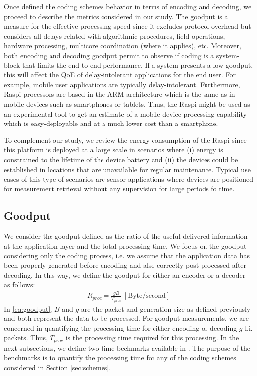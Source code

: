 \label{sec:metrics}

Once defined the coding schemes behavior in terms of encoding
and decoding, we proceed to describe the metrics considered in our study.
The goodput is a measure for the effective processing speed since it
excludes protocol overhead but considers all delays related with
algorithmic procedures, field operations, hardware processing, multicore
coordination (where it applies), etc. Moreover, both encoding and decoding
goodput permit to observe if coding is a system-block that limits the
end-to-end performance. If a system presents a low goodput, this will
affect the \ac{QoE} of delay-intolerant applications for the end user.
For example, mobile user applications are typically delay-intolerant.
Furthermore, \ac{Raspi} processors are based in the \ac{ARM} architecture
which is the same as in mobile devices such as smartphones or tablets.
Thus, the \ac{Raspi} might be used as an experimental tool to get an
estimate of a mobile device processing capability which is easy-deployable
and at a much lower cost than a smartphone.

To complement our study, we review the energy consumption of the \ac{Raspi}
since this platform is deployed at a large scale in scenarios where (i)
energy is constrained to the lifetime of the device battery and (ii) the
devices could be established in locations that are unavailable for
regular maintenance. Typical use cases of this type of scenarios are
sensor applications where devices are positioned for measurement retrieval
without any supervision for large periods fo time.

\subsection{Goodput}
We consider the goodput defined as the ratio of the useful delivered
information at the application layer and the total processing time. We focus
on the goodput considering only the coding process, i.e. we assume that
the application data has been properly generated before encoding and
also correctly post-processed after decoding. In this way, we define
the goodput for either an encoder or a decoder as follows:
%
\begin{align} \label{eq:goodput}
R_{proc} = \frac{gB}{T_{proc}} ~ [\mathrm{Byte/second}]
\end{align}
%
In \eqref{eq:goodput}, $B$ and $g$ are the packet and generation size
as defined previously and both represent the data to be processed. For
goodput measurements, we are concerned in quantifying the processing time
for either encoding or decoding $g$ \ac{l.i.} packets. Thus, $T_{proc}$ is
the processing time required for this processing. In the next subsections, we
define two time bechmarks available in \cite{soerensen2016sparse}.
The purpose of the benchmarks is to quantify the processing time for
any of the coding schemes considered in Section \ref{sec:schemes}.

